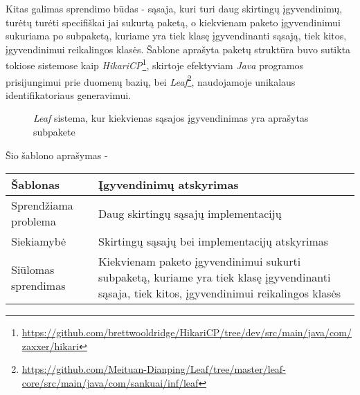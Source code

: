 Kitas galimas sprendimo būdas - sąsaja, kuri turi daug skirtingų įgyvendinimų, turėtų turėti specifiškai jai sukurtą paketą, o kiekvienam paketo
įgyvendinimui sukuriama po subpaketą, kuriame yra tiek klasę įgyvendinanti sąsają, tiek kitos, įgyvendinimui reikalingos klasės.
Šablone aprašyta paketų struktūra buvo sutikta tokiose sistemose kaip \textit{HikariCP}\footnote{\url{https://github.com/brettwooldridge/HikariCP/tree/dev/src/main/java/com/zaxxer/hikari}},
skirtoje efektyviam \textit{Java} programos prisijungimui prie duomenų bazių, bei
\textit{Leaf}\footnote{\url{https://github.com/Meituan-Dianping/Leaf/tree/master/leaf-core/src/main/java/com/sankuai/inf/leaf}}, naudojamoje unikalaus identifikatoriaus generavimui.

\begin{figure}[H]
    \snugshade
    \endsnugshade
    \caption{\textit{Leaf} sistema, kur kiekvienas sąsajos įgyvendinimas yra aprašytas subpakete}
\end{figure}
Šio šablono aprašymas -
\begin{center}
    \begin{tabular}{|p{5cm}|p{10cm}|}
        \hline
        Šablonas & Įgyvendinimų atskyrimas \\ [0.5ex]
        \hline\hline
        Sprendžiama problema & Daug skirtingų sąsajų implementacijų\\
        \hline
        Siekiamybė &  Skirtingų sąsajų bei implementacijų atskyrimas\\
        \hline
        Siūlomas sprendimas & Kiekvienam paketo įgyvendinimui sukurti subpaketą, kuriame yra tiek klasę įgyvendinanti sąsaja, tiek kitos, įgyvendinimui reikalingos klasės \\
        \hline
    \end{tabular}
\end{center}

